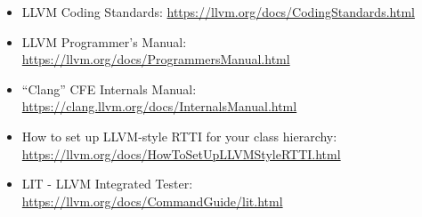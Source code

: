 \begin{itemize}
\item
LLVM Coding Standards: \url{https://llvm.org/docs/CodingStandards.html}

\item
LLVM Programmer's Manual: \url{https://llvm.org/docs/ProgrammersManual.html}

\item
“Clang” CFE Internals Manual: \url{https://clang.llvm.org/docs/InternalsManual.html}

\item
How to set up LLVM-style RTTI for your class hierarchy: \url{https://llvm.org/docs/HowToSetUpLLVMStyleRTTI.html}

\item
LIT - LLVM Integrated Tester: \url{https://llvm.org/docs/CommandGuide/lit.html}
\end{itemize}

